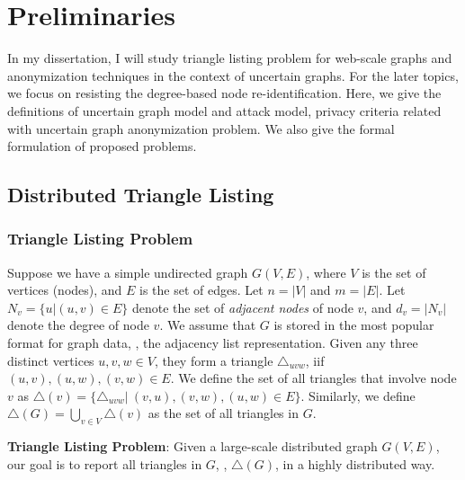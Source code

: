 \chapter {Preliminaries}
\label{chp:pre}

In my dissertation, I will study triangle listing problem for web-scale graphs and anonymization techniques in the context of uncertain graphs. For the later topics, we focus on resisting the degree-based node re-identification. Here, we give the definitions of uncertain graph model and attack model, privacy criteria related with uncertain graph anonymization problem. We also give the formal formulation of proposed problems. 

\section{Distributed Triangle Listing}
\subsection{Triangle Listing Problem}
Suppose we have a simple undirected graph $G(V,E)$, where $V$ is the set of vertices (nodes), and $E$ is the set of edges. Let $n=|V|$ and $m=|E|$. Let $N_v = \{u | (u,v) \in E \}$ denote the set of \emph{adjacent nodes} of node $v$, and $d_v=|N_v|$ denote the degree of node $v$. We assume that  $G$ is stored in the most popular format for graph data, {\ie}, the adjacency list representation. Given any three distinct vertices $u, v, w \in V$, they form a triangle $\triangle_{uvw}$, iif $(u,v), (u,w), (v,w) \in E$. We define the set of all triangles that involve node $v$ as $\triangle(v)=\{ \triangle_{uvw} | \  (v,u), (v,w), (u,w) \in E \}$. Similarly, we define $\triangle(G)= \bigcup_{v \in V} {\triangle (v)}$ as the set of all triangles in $G$.

\begin{problem}
    \textbf{Triangle Listing Problem}: Given a  large-scale distributed graph $G(V,E)$, our goal is to report all triangles in $G$, {\ie}, $\triangle(G)$, in a highly distributed way. 
    \label{prob:TLMap}
\end{problem}

